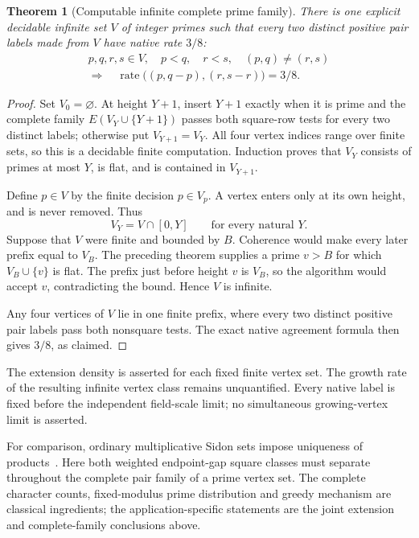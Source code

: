 \documentclass[11pt]{article}
\newtheorem{theorem}{Theorem}[section]
\begin{document}
\begin{theorem}[Computable infinite complete prime family]
\label{thm:native-complete-prime-vertices}
There is one explicit decidable infinite set \(V\) of integer primes
such that every two distinct positive pair labels made from \(V\)
have native rate \(3/8\):
\[
 \begin{gathered}
 p,q,r,s\in V,\quad p<q,\quad r<s,\quad (p,q)\ne(r,s)\\
 \Longrightarrow\quad
 \operatorname{rate}\bigl((p,q-p),(r,s-r)\bigr)=3/8.
 \end{gathered}
\]
\end{theorem}
\begin{proof}
Set \(V_0=\varnothing\). At height \(Y+1\), insert \(Y+1\) exactly
when it is prime and the complete family \(E(V_Y\cup\{Y+1\})\)
passes both square-row tests for every two distinct labels;
otherwise put \(V_{Y+1}=V_Y\). All four vertex indices range over
finite sets, so this is a decidable finite computation. Induction
proves that \(V_Y\) consists of primes at most \(Y\), is flat, and
is contained in \(V_{Y+1}\).

Define \(p\in V\) by the finite decision \(p\in V_p\).
A vertex enters only at its own height, and is never removed. Thus
\[
 V_Y=V\cap[0,Y]\qquad\text{for every natural }Y.
\]
Suppose that \(V\) were finite and bounded by \(B\). Coherence would
make every later prefix equal to \(V_B\). The preceding theorem
supplies a prime \(v>B\) for which \(V_B\cup\{v\}\) is flat.
The prefix just before height \(v\) is \(V_B\), so the algorithm
would accept \(v\), contradicting the bound. Hence \(V\) is infinite.

Any four vertices of \(V\) lie in one finite prefix, where every
two distinct positive pair labels pass both nonsquare tests.
The exact native agreement formula then gives \(3/8\), as claimed.
\end{proof}

The extension density is asserted for each fixed finite vertex set.
The growth rate of the resulting infinite vertex class remains
unquantified. Every native label is fixed before the independent
field-scale limit; no simultaneous growing-vertex limit is asserted.

For comparison, ordinary multiplicative Sidon sets impose uniqueness
of products~\cite{LiuPachMultiplicativeSidon}. Here both weighted
endpoint-gap square classes must separate throughout the complete
pair family of a prime vertex set. The complete character counts,
fixed-modulus prime distribution and greedy mechanism are classical
ingredients; the application-specific statements are the joint
extension and complete-family conclusions above.
\end{document}

